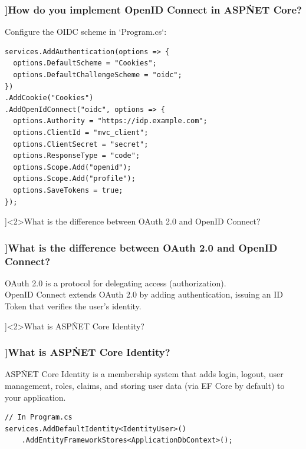 \begin{frame}[fragile]
  \frametitle{\AnswerTitle[\CategoryBadge[OOPColor!20]{C\#} ]{How do you implement OpenID Connect in ASP\.NET Core?}}

  {\footnotesize
  Configure the OIDC scheme in `Program.cs`:
  }

  \begin{verbatim}
services.AddAuthentication(options => {
  options.DefaultScheme = "Cookies";
  options.DefaultChallengeScheme = "oidc";
})
.AddCookie("Cookies")
.AddOpenIdConnect("oidc", options => {
  options.Authority = "https://idp.example.com";
  options.ClientId = "mvc_client";
  options.ClientSecret = "secret";
  options.ResponseType = "code";
  options.Scope.Add("openid");
  options.Scope.Add("profile");
  options.SaveTokens = true;
});
  \end{verbatim}
\end{frame}

\QuestionSlide[\CategoryBadge[AuthColor!20]{Security}]<2>{What is the difference between OAuth 2.0 and OpenID Connect?}

\begin{frame}[fragile]
  \frametitle{\AnswerTitle[\CategoryBadge[OOPColor!20]{C\#} ]{What is the difference between OAuth 2.0 and OpenID Connect?}}

  {\footnotesize
  OAuth 2.0 is a protocol for delegating access (authorization).\\
  OpenID Connect extends OAuth 2.0 by adding authentication, issuing an ID Token that verifies the user’s identity.
  }
\end{frame}

\QuestionSlide[\CategoryBadge[AuthColor!20]{Security}]<2>{What is ASP\.NET Core Identity?}

\begin{frame}[fragile]
  \frametitle{\AnswerTitle[\CategoryBadge[OOPColor!20]{C\#} ]{What is ASP\.NET Core Identity?}}

  {\footnotesize
  ASP\.NET Core Identity is a membership system that adds login, logout, user management, roles, claims, and storing user data (via EF Core by default) to your application.
  }

  \begin{verbatim}
// In Program.cs
services.AddDefaultIdentity<IdentityUser>()
    .AddEntityFrameworkStores<ApplicationDbContext>();
  \end{verbatim}
\end{frame}

